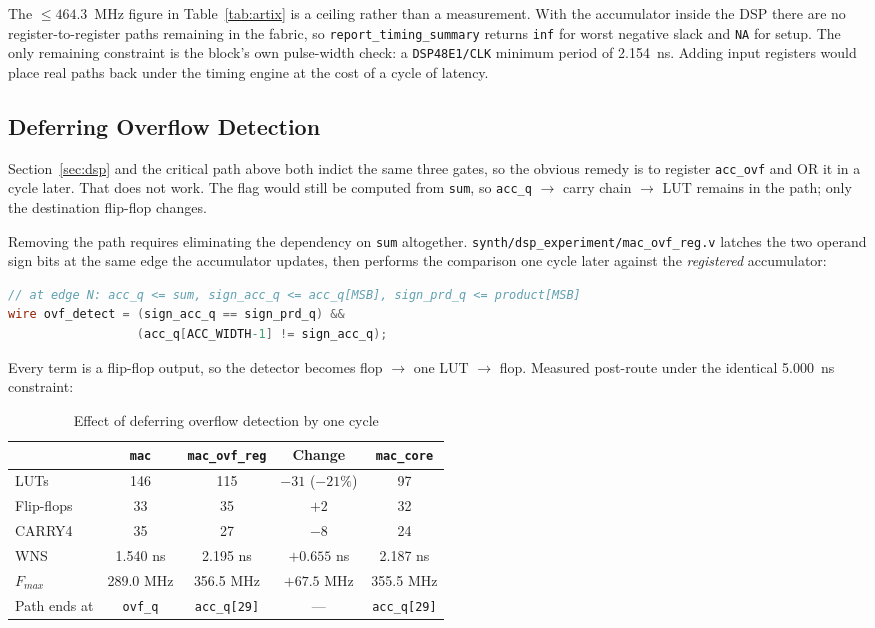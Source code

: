 \documentclass[letterpaper,12pt]{article}
\begin{document}
The $\leq 464.3$~MHz figure in Table~\ref{tab:artix} is a ceiling rather than a
measurement. With the accumulator inside the DSP there are no
register-to-register paths remaining in the fabric, so
\texttt{report\_timing\_summary} returns \texttt{inf} for worst negative slack
and \texttt{NA} for setup. The only remaining constraint is the block's own
pulse-width check: a \texttt{DSP48E1/CLK} minimum period of 2.154~ns. Adding
input registers would place real paths back under the timing engine at the cost
of a cycle of latency.

\subsection{Deferring Overflow Detection}
\label{sec:defer}

Section~\ref{sec:dsp} and the critical path above both indict the same three
gates, so the obvious remedy is to register \texttt{acc\_ovf} and OR it in a
cycle later. That does not work. The flag would still be computed from
\texttt{sum}, so \texttt{acc\_q} $\rightarrow$ carry chain $\rightarrow$ LUT
remains in the path; only the destination flip-flop changes.

Removing the path requires eliminating the dependency on \texttt{sum}
altogether. \texttt{synth/dsp\_experiment/mac\_ovf\_reg.v} latches the two
operand sign bits at the same edge the accumulator updates, then performs the
comparison one cycle later against the \emph{registered} accumulator:

\begin{lstlisting}[language=Verilog]
// at edge N: acc_q <= sum, sign_acc_q <= acc_q[MSB], sign_prd_q <= product[MSB]
wire ovf_detect = (sign_acc_q == sign_prd_q) &&
                  (acc_q[ACC_WIDTH-1] != sign_acc_q);
\end{lstlisting}

Every term is a flip-flop output, so the detector becomes
flop $\rightarrow$ one LUT $\rightarrow$ flop. Measured post-route under the
identical 5.000~ns constraint:

\begin{table}[H]
\centering
\caption{Effect of deferring overflow detection by one cycle}
\label{tab:defer}
\renewcommand{\arraystretch}{1.3}
\begin{tabular}{|l|c|c|c|c|}
\hline
 & \textbf{\texttt{mac}} & \textbf{\texttt{mac\_ovf\_reg}} & \textbf{Change} & \textbf{\texttt{mac\_core}} \\
\hline
LUTs        & 146       & 115       & $-31$ ($-21\%$) & 97 \\
Flip-flops  & 33        & 35        & $+2$            & 32 \\
CARRY4      & 35        & 27        & $-8$            & 24 \\
WNS         & 1.540 ns  & 2.195 ns  & $+0.655$ ns     & 2.187 ns \\
$F_{max}$   & 289.0 MHz & 356.5 MHz & $+67.5$ MHz     & 355.5 MHz \\
Path ends at & \texttt{ovf\_q} & \texttt{acc\_q[29]} & --- & \texttt{acc\_q[29]} \\
\hline
\end{tabular}
\end{table}
\end{document}
